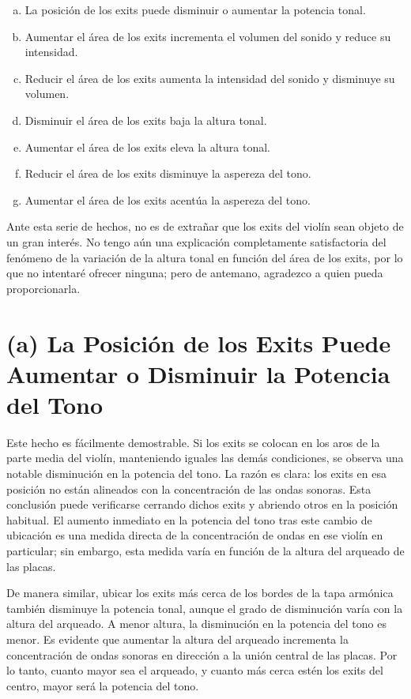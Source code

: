 \documentclass[12pt]{book}
\begin{document}
\begin{enumerate}[(a)]
    \item La posición de los exits puede disminuir o aumentar la potencia tonal.
    \item Aumentar el área de los exits incrementa el volumen del sonido y reduce su intensidad.
    \item Reducir el área de los exits aumenta la intensidad del sonido y disminuye su volumen.
    \item Disminuir el área de los exits baja la altura tonal.
    \item Aumentar el área de los exits eleva la altura tonal.
    \item Reducir el área de los exits disminuye la aspereza del tono.
    \item Aumentar el área de los exits acentúa la aspereza del tono.
\end{enumerate}

Ante esta serie de hechos, no es de extrañar que los exits del violín sean objeto de un gran interés. No tengo aún una explicación completamente satisfactoria del fenómeno de la variación de la altura tonal en función del área de los exits, por lo que no intentaré ofrecer ninguna; pero de antemano, agradezco a quien pueda proporcionarla.

\section*{(a) La Posición de los Exits Puede Aumentar o Disminuir la Potencia del Tono}

Este hecho es fácilmente demostrable. Si los exits se colocan en los aros de la parte media del violín, manteniendo iguales las demás condiciones, se observa una notable disminución en la potencia del tono. La razón es clara: los exits en esa posición no están alineados con la concentración de las ondas sonoras. Esta conclusión puede verificarse cerrando dichos exits y abriendo otros en la posición habitual. El aumento inmediato en la potencia del tono tras este cambio de ubicación es una medida directa de la concentración de ondas en ese violín en particular; sin embargo, esta medida varía en función de la altura del arqueado de las placas.

De manera similar, ubicar los exits más cerca de los bordes de la tapa armónica también disminuye la potencia tonal, aunque el grado de disminución varía con la altura del arqueado. A menor altura, la disminución en la potencia del tono es menor. Es evidente que aumentar la altura del arqueado incrementa la concentración de ondas sonoras en dirección a la unión central de las placas. Por lo tanto, cuanto mayor sea el arqueado, y cuanto más cerca estén los exits del centro, mayor será la potencia del tono.
\end{document}
